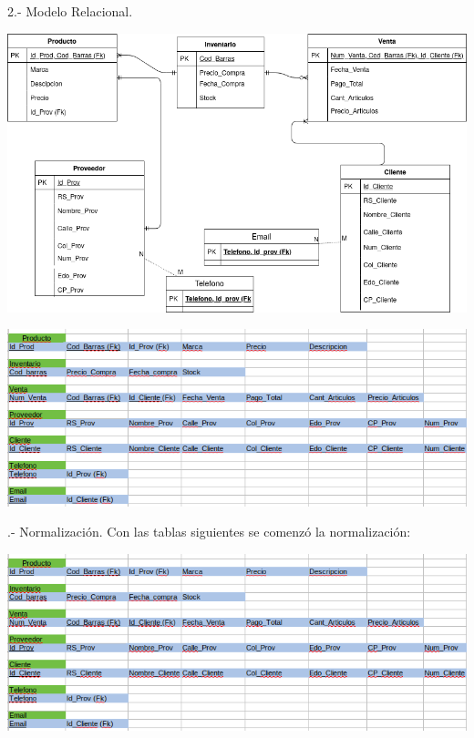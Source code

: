 \documentclass[12pt, letterpaper]{article}     %
\begin{document}
	2.- Modelo Relacional.
	
	\vspace{5mm} %
	\begin{center}
	\includegraphics[scale=0.4]{ModeloRelacional}
	\end{center}
	
	\begin{center}
	\includegraphics[scale=0.45]{tabla}
	\end{center}	
	
	.- Normalización.
	\vspace{5mm} %
	Con las tablas siguientes se comenzó la normalización:
	
	\begin{center}
   \includegraphics[scale=0.45]{tabla}
	\end{center}
	
\end{document}
